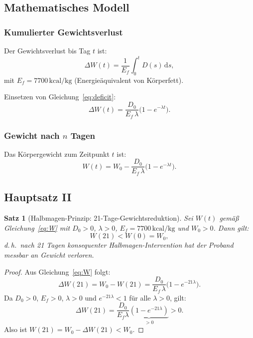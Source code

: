 ﻿\documentclass[12pt,a4paper]{article}
\theoremstyle{plain}
\newtheorem{theorem}{Satz}[section]
\theoremstyle{definition}
\theoremstyle{remark}
\begin{document}
\subsection{Mathematisches Modell}

\subsubsection{Kumulierter Gewichtsverlust}

Der Gewichtsverlust bis Tag $t$ ist:
\begin{equation}
  \Delta W(t) = \frac{1}{E_f} \int_0^t D(s)\,\mathrm{d}s,
  \label{eq:dW_int}
\end{equation}
mit $E_f = 7700\,\text{kcal/kg}$ (Energieäquivalent von Körperfett).

Einsetzen von Gleichung~\eqref{eq:deficit}:
\begin{equation}
  \Delta W(t) = \frac{D_0}{E_f \, \lambda}
    \bigl(1 - e^{-\lambda t}\bigr).
  \label{eq:dW}
\end{equation}

\subsubsection{Gewicht nach $n$ Tagen}

Das Körpergewicht zum Zeitpunkt $t$ ist:
\begin{equation}
  \boxed{W(t) = W_0 - \frac{D_0}{E_f \, \lambda}
    \bigl(1 - e^{-\lambda t}\bigr).}
  \label{eq:W}
\end{equation}

\subsection{Hauptsatz II}

\begin{theorem}[Halbmagen-Prinzip: 21-Tage-Gewichtsreduktion]
\label{thm:diet}
Sei $W(t)$ gemäß Gleichung~\eqref{eq:W} mit $D_0 > 0$, $\lambda > 0$,
$E_f = 7700\,\text{kcal/kg}$ und $W_0 > 0$. Dann gilt:
\begin{equation}
  W(21) < W(0) = W_0,
  \label{eq:loss}
\end{equation}
d.\,h.\ nach 21 Tagen konsequenter Halbmagen-Intervention hat der Proband
messbar an Gewicht verloren.
\end{theorem}

\begin{proof}
Aus Gleichung~\eqref{eq:W} folgt:
\begin{equation}
  \Delta W(21) = W_0 - W(21) = \frac{D_0}{E_f \, \lambda}\bigl(1-e^{-21\lambda}\bigr).
\end{equation}
Da $D_0 > 0$, $E_f > 0$, $\lambda > 0$ und $e^{-21\lambda} < 1$ für alle
$\lambda > 0$, gilt:
\begin{equation}
  \Delta W(21) = \frac{D_0}{E_f \lambda}\underbrace{(1-e^{-21\lambda})}_{>0} > 0.
\end{equation}
Also ist $W(21) = W_0 - \Delta W(21) < W_0$.
\end{proof}
\end{document}
